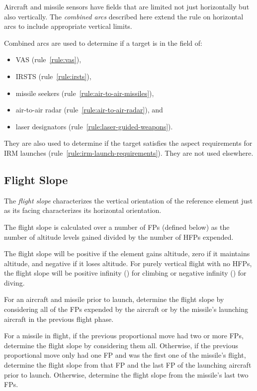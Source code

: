\begin{advancedrules}
{    }{

        Aircraft and missile sensors have fields that are limited not just horizontally but also vertically. The \emph{combined arcs} described here extend the rule on horizontal arcs to include appropriate vertical limits.

        Combined arcs are used to determine if a target is in the field of:
        \begin{itemize}
            \item VAS (rule~\ref{rule:vas}),
            \item IRSTS (rule~\ref{rule:irsts}),
            \item missile seekers (rule~\ref{rule:air-to-air-missiles}),
            \item air-to-air radar (rule~\ref{rule:air-to-air-radar}), and
            \item laser designators (rule~\ref{rule:laser-guided-weapons}).
        \end{itemize}
        They are also used to determine if the target satisfies the aspect requirements for IRM launches (rule~\ref{rule:irm-launch-requirements}). They are not used elsewhere.

        \subsection{Flight Slope}

        The \emph{flight slope} characterizes the vertical orientation of the reference element just as its facing characterizes its horizontal orientation.

        The flight slope is calculated over a number of FPs (defined below) as the number of altitude levels gained divided by the number of HFPs expended.

        The flight slope will be positive if the element gains altitude, zero if it maintains altitude, and negative if it loses altitude. For purely vertical flight with no HFPs, the flight slope will be positive infinity (\plus{\textinfinity}) for climbing or negative infinity (\minus{\textinfinity}) for diving.

        For an aircraft and missile prior to launch, determine the flight slope by considering all of the FPs expended by the aircraft or by the missile’s launching aircraft in the previous flight phase.

        For a missile in flight, if the previous proportional move had two or more FPs, determine the flight slope by considering them all. Otherwise, if the previous proportional move only had one FP and was the first one of the missile’s flight, determine the flight slope from that FP and the last FP of the launching aircraft prior to launch. Otherwise, determine the flight slope from the missile’s last two FPs.

}
\end{advancedrules}
